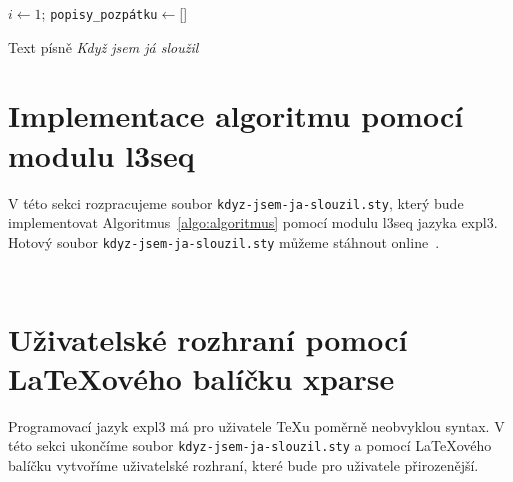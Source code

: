 \documentclass{csbulletin}
\newenvironment{mintedblock}{%
  \par\vspace{\topsep}\vspace{\partopsep}%
  \begingroup
  \fvset{listparameters=\setlength{\topsep}{0pt}\setlength{\partopsep}{0pt}}%
}{%
  \endgroup
  \par\vspace{\topsep}\vspace{\partopsep}%
}
\newcommand\pkg{\textsf}
\begin{document}
\begin{algorithm}
\DontPrintSemicolon
{}
$i\leftarrow 1$;
\texttt{popisy\_pozpátku}${}\leftarrow{}$[]\;
\caption{Text písně \emph{Když jsem já sloužil}}
\label{algo:algoritmus}
\end{algorithm}

\section{Implementace algoritmu pomocí modulu \pkg{l3seq}}
\label{sec:implementace}

V této sekci rozpracujeme soubor \texttt{kdyz-jsem-ja-slouzil.sty}, který bude implementovat Algoritmus~\ref{algo:algoritmus} pomocí modulu \pkg{l3seq} jazyka expl3. Hotový soubor \texttt{kdyz-jsem-ja-slouzil.sty} můžeme stáhnout online~\cite{starynovotny2023sazba}.

\begin{mintedblock}
\inputminted{tex}{kdyz-jsem-ja-slouzil-01.sty}
\inputminted{tex}{kdyz-jsem-ja-slouzil-02.sty}
\end{mintedblock}

\section{Uživatelské rozhraní pomocí \LaTeX ového balíčku \pkg{xparse}}
\label{sec:rozhrani}

Programovací jazyk expl3 má pro uživatele \TeX u poměrně neobvyklou syntax. V této sekci ukončíme soubor \texttt{kdyz-jsem-ja-slouzil.sty} a pomocí \LaTeX ového balíčku vytvoříme uživatelské rozhraní, které bude pro uživatele přirozenější.
\end{document}
